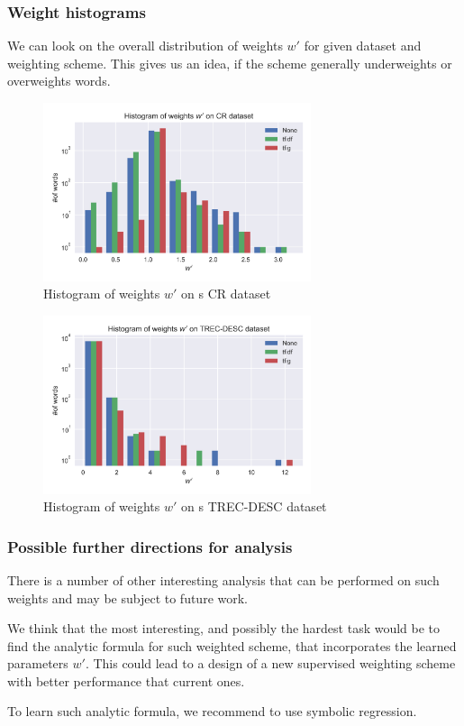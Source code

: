     \* %

    \subsubsection{Weight histograms}
    
    We can look on the overall distribution of weights $w'$ for given dataset and weighting scheme.
    This gives us an idea, if the scheme generally underweights or overweights words.
    
    \begin{figure}
    \centerline{\includegraphics[width=0.7\textwidth]{images/histw_cr.png}}
    \caption[Histogram of weights $w'$ on s CR dataset]{Histogram of weights $w'$ on s CR dataset}
    \label{obr:hist:cr}
    \end{figure}

    \begin{figure}
    \centerline{\includegraphics[width=0.7\textwidth]{images/histw_desc.png}}
    \caption[Histogram of weights $w'$ on s TREC-DESC dataset]{Histogram of weights $w'$ on s TREC-DESC dataset}
    \label{obr:hist:desc}
    \end{figure}

    \* %

    \subsubsection{Possible further directions for analysis}
    
    There is a number of other interesting analysis that can be performed on such weights and may be subject to future work.
    
    We think that the most interesting, and possibly the hardest task would be to find the analytic formula for such weighted scheme, that incorporates the learned parameters $w'$. 
    This could lead to a design of a new supervised weighting scheme with better performance that current ones.
    
    To learn such analytic formula, we recommend to use symbolic regression.
